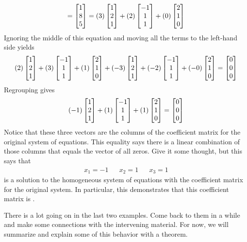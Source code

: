 \documentclass{ximera}
\begin{document}
\begin{example}
\[    =
    \begin{bmatrix}1\\8\\5\end{bmatrix}
    =
    (3)\begin{bmatrix}1\\2\\1\end{bmatrix}+
    (2)\begin{bmatrix}-1\\1\\1\end{bmatrix}+
    (0)\begin{bmatrix}2\\1\\0\end{bmatrix}
  \]
  Ignoring the middle of this equation and moving all the terms to the left-hand side yields
  \[
    (2)\begin{bmatrix}1\\2\\1\end{bmatrix}+
    (3)\begin{bmatrix}-1\\1\\1\end{bmatrix}+
    (1)\begin{bmatrix}2\\1\\0\end{bmatrix}+
    (-3)\begin{bmatrix}1\\2\\1\end{bmatrix}+
    (-2)\begin{bmatrix}-1\\1\\1\end{bmatrix}+
    (-0)\begin{bmatrix}2\\1\\0\end{bmatrix}
    =
    \begin{bmatrix}0\\0\\0\end{bmatrix}
  \]
  Regrouping gives
  \[
    (-1)\begin{bmatrix}1\\2\\1\end{bmatrix}+
    (1)\begin{bmatrix}-1\\1\\1\end{bmatrix}+
    (1)\begin{bmatrix}2\\1\\0\end{bmatrix}
    =
    \begin{bmatrix}0\\0\\0\end{bmatrix}
  \]
  Notice that these three vectors are the columns of the coefficient
  matrix for the original system of equations.  This equality says
  there is a linear combination of those columns that equals the
  vector of all zeros.  Give it some thought, but this says that
  \begin{align*}
    x_1=-1&&x_2=1&&x_3=1
  \end{align*}
  is a 
  solution to the homogeneous system of equations with the coefficient
  matrix for the original system.  In particular, this demonstrates
  that this coefficient matrix is
  .
\end{example}

There is a lot going on in the last two examples.  Come back to them
in a while and make some connections with the intervening material.
For now, we will summarize and explain some of this behavior with a
theorem.
\end{document}
